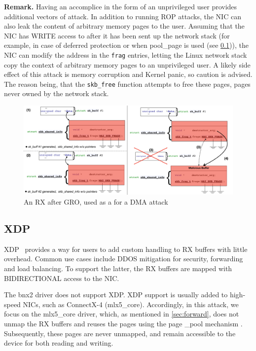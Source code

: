 \smallskip
\noindent\textbf{Remark.} Having an accomplice in the form of an unprivileged user provides additional vectors of attack. In addition to running ROP attacks, the NIC can also leak the content of arbitrary memory pages to the user. Assuming that the NIC has WRITE access to \shinfo{} after it has been sent up the network stack (for example, in case of deferred protection or when pool\_page is used (see \ref{sec:xdp})), the NIC can modify the \page{} address in the \texttt{frag} entries, letting the Linux network stack copy the context of arbitrary memory pages to an unprivileged user. A likely side effect of this attack is memory corruption and Kernel panic, so caution is advised. The reason being, that the \texttt{skb\_free} function attempts to free these pages, pages never owned by the network stack.


\begin{figure}[t]
    \centering
    \includegraphics[width=\linewidth]{figs/gro.pdf}
    \caption{An RX \skb after GRO, used as a \means for a DMA attack}
    \label{fig:gro}
\end{figure}

\subsection{XDP}\label{sec:xdp}

XDP~\cite{xdp} provides a way for users to add custom handling to RX buffers with little overhead. Common use cases include DDOS mitigation for security, forwarding and load balancing. To support the latter, the RX buffers are mapped with BIDIRECTIONAL access to the NIC. 

The bnx2 driver does not support XDP. XDP support is usually added to high-speed NICs, such as ConnectX-4 (mlx5\_core). Accordingly, in this attack, we focus on the mlx5\_core driver, which, as mentioned in \ref{sec:forward}, does not unmap the RX buffers and reuses the pages using the page \_pool mechanism \cite{page_pool}. Subsequently, these pages are never unmapped, and remain accessible to the device for both reading and writing. 

